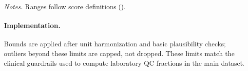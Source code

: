 \noindent\textit{Notes.} Ranges follow score definitions (\citealt{APACHEIII,PhysiopediaSOFA}).

\vspace{0.75\baselineskip}
\paragraph{Implementation.} Bounds are applied after unit harmonization and basic plausibility checks; outliers beyond these limits are capped, not dropped. These limits match the clinical guardrails used to compute laboratory QC fractions in the main dataset.

